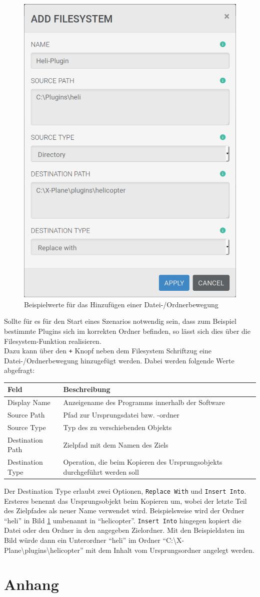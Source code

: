 \documentclass[accentcolor=tud1c, paper=a4, colorback]{tudreport}
\begin{document}
	\begin{figure}[h]
		\centering
		\includegraphics[width=.4\textwidth]{add_filesystem}
		\caption{Beispielwerte für das Hinzufügen einer Datei-/Ordnerbewegung}
		\label{add_program}
	\end{figure}

	Sollte für es für den Start eines Szenarios notwendig sein, dass zum Beispiel bestimmte
	Plugins sich im korrekten Ordner befinden, so lässt sich dies über die Filesystem-Funktion
	realisieren.
	\\
	Dazu kann über den \texttt{+} Knopf neben dem Filesystem Schriftzug eine Datei-/Ordnerbewegung
	hinzugefügt werden. Dabei werden folgende Werte abgefragt:
	\\
	\begin{center}
	\begin{tabular}{l|l}
		Feld & Beschreibung \\\hline
		Display Name &  Anzeigename des Programms innerhalb der Software\\
		Source Path & Pfad zur Ursprungsdatei bzw. -ordner\\
		Source Type & Typ des zu verschiebenden Objekts\\
		Destination Path & Zielpfad mit dem Namen des Ziels\\
		Destination Type & Operation, die beim Kopieren des Ursprungsobjekts durchgeführt werden soll\\
	\end{tabular}
	\end{center}
	Der Destination Type erlaubt zwei Optionen, \texttt{Replace With} und \texttt{Insert Into}.
	Ersteres benennt das Ursprungsobjekt beim Kopieren um, wobei der letzte Teil des Zielpfades
	als neuer Name verwendet wird. Beispielsweise wird der Ordner "`heli"' in Bild \ref{add_program}
	umbenannt in "`helicopter"'.
	\texttt{Insert Into} hingegen kopiert die Datei oder den Ordner in den angegeben Zielordner.
	Mit den Beispieldaten im Bild würde dann ein Unterordner "`heli"' im Ordner 
	"`C:\textbackslash X-Plane\textbackslash plugins\textbackslash helicopter"' mit dem Inhalt vom Ursprungsordner angelegt werden.

	\chapter{Anhang}

	\clearpage
	\printindex
\end{document}
